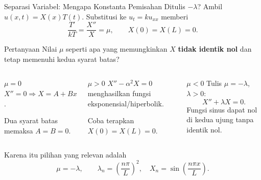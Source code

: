 \documentclass[aspectratio=169,10pt]{beamer}
\begin{document}
\begin{frame}{Separasi Variabel: Mengapa Konstanta Pemisahan Ditulis $-\lambda$?}
\footnotesize
Ambil $u(x,t)=X(x)T(t)$. Substitusi ke $u_t=k u_{xx}$ memberi
\[
\frac{T'}{kT}=\frac{X''}{X}=\mu,
\qquad X(0)=X(L)=0.
\]
\begin{block}{Pertanyaan}
Nilai $\mu$ seperti apa yang memungkinkan $X$ \textbf{tidak identik nol} dan tetap memenuhi kedua syarat batas?
\end{block}
\begin{columns}[T,onlytextwidth]
\begin{block}{$\mu=0$}
$X''=0\Rightarrow X=A+Bx$.

Dua syarat batas memaksa $A=B=0$.
\end{block}
\begin{block}{$\mu>0$}
$X''-\alpha^2X=0$ menghasilkan fungsi eksponensial/hiperbolik.

Coba terapkan $X(0)=X(L)=0$.
\end{block}
\begin{block}{$\mu<0$}
Tulis $\mu=-\lambda$, $\lambda>0$:
\[
X''+\lambda X=0.
\]
Fungsi sinus dapat nol di kedua ujung tanpa identik nol.
\end{block}
\end{columns}
\vspace{0.08cm}
Karena itu pilihan yang relevan adalah
\[
\boxed{\mu=-\lambda},\qquad
\lambda_n=\left(\frac{n\pi}{L}\right)^2,
\quad X_n=\sin\left(\frac{n\pi x}{L}\right).
\]
\end{frame}
\end{document}
